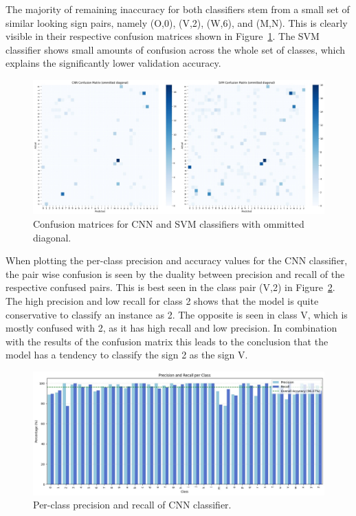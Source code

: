 \documentclass[a4, 10 pt, conference]{ieeeconf}  %
\begin{document}
The majority of remaining inaccuracy for both classifiers stem from a small set of similar
looking sign pairs, namely (O,0), (V,2), (W,6), and (M,N). This is clearly visible
in their respective confusion matrices shown in Figure~\ref{fig:cm}. The SVM 
classifier shows small amounts of confusion across the whole set of classes,
which explains the significantly lower validation accuracy.

\begin{figure}[htb]
  \centering
  \includegraphics[width=\linewidth]{../images/cm_comparison.jpg}
  \caption{Confusion matrices for CNN and SVM classifiers with ommitted diagonal.}
  \label{fig:cm}
\end{figure}

When plotting the per-class precision and accuracy values for the CNN classifier,
the pair wise confusion is seen by the duality between precision and recall of the 
respective confused pairs. This is best seen in the class pair (V,2) in 
Figure~\ref{fig:class_precision_recall}. The high precision and low recall for
class 2 shows that the model is quite conservative to classify an instance as 2. 
The opposite is seen in class V, which is mostly confused with 2, as it has high
recall and low precision. In combination with the results of the confusion matrix
this leads to the conclusion that the model has a tendency to classify the sign 2
as the sign V.

\begin{figure}[htb]
  \centering
  \includegraphics[width=\linewidth]{../images/class_accuracy_cnn.jpg}
  \caption{Per-class precision and recall of CNN classifier.}
  \label{fig:class_precision_recall}
\end{figure}
\end{document}
